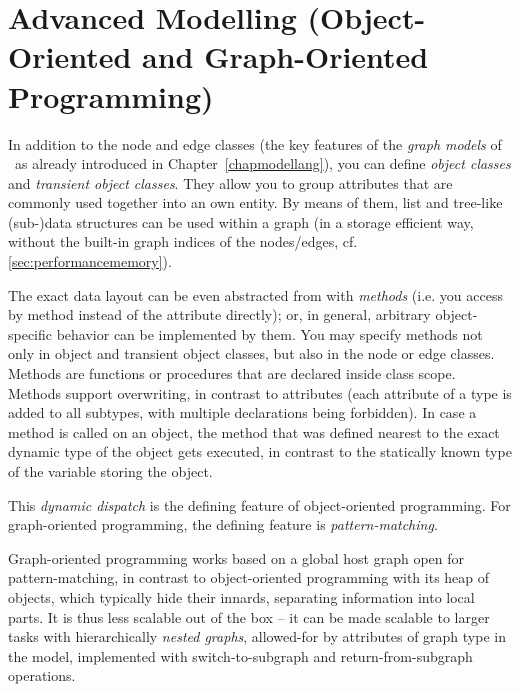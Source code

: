 \chapter{Advanced Modelling (Object-Oriented and Graph-Oriented Programming)}
\label{cha:modeladvanced}


In addition to the node and edge classes (the key features of the \emph{graph models} of \GrG\ as already introduced in Chapter~\ref{chapmodellang}),
you can define \emph{object classes} and \emph{transient object classes}.
They allow you to group attributes that are commonly used together into an own entity.
By means of them, list and tree-like (sub-)data structures can be used within a graph (in a storage efficient way, without the built-in graph indices of the nodes/edges, cf. \ref{sec:performancememory}).

The exact data layout can be even abstracted from with \emph{methods} (i.e. you access by method instead of the attribute directly); or, in general, arbitrary object-specific behavior can be implemented by them.
You may specify methods not only in object and transient object classes, but also in the node or edge classes.
Methods are functions or procedures that are declared inside class scope.
Methods support overwriting, in contrast to attributes (each attribute of a type is added to all subtypes, with multiple declarations being forbidden).
In case a method is called on an object, the method that was defined nearest to the exact dynamic type of the object gets executed, in contrast to the statically known type of the variable storing the object.

This \emph{dynamic dispatch} is the defining feature of object-oriented programming.
For graph-oriented programming, the defining feature is \emph{pattern-matching}.

Graph-oriented programming works based on a global host graph open for pattern-matching, in contrast to object-oriented programming with its heap of objects, which typically hide their innards, separating information into local parts. 
It is thus less scalable out of the box -- it can be made scalable to larger tasks with hierarchically \emph{nested graphs}, allowed-for by attributes of graph type in the model, implemented with switch-to-subgraph and return-from-subgraph operations.

